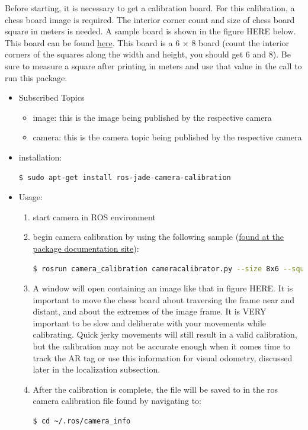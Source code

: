 \noindent Before starting, it is necessary to get a calibration board. For this calibration, a chess board image is required. The interior corner count and size of chess board square in meters is needed. A sample board is shown in the figure HERE below. This board can be found \href{http://wiki.ros.org/camera_calibration/Tutorials/
MonocularCalibration?action=AttachFile&do=view&target=check-108.pdf}{here}. This board is a 6 $\times$ 8 board (count the interior corners of the squares along the width and height, you should get 6 and 8). Be sure to measure a square after printing in meters and use that value in the call to run this package.\\ 
\begin{itemize}
\item Subscribed Topics
\begin{itemize}
\item image: this is the image being published by the respective camera 
\item camera: this is the camera topic being published by the respective camera
\end{itemize}
\item installation:
\begin{lstlisting}[language=bash]
$ sudo apt-get install ros-jade-camera-calibration
\end{lstlisting}
\item Usage:
\begin{enumerate}
\item start camera in ROS environment
\item begin camera calibration by using the following sample (\href{http://wiki.ros.org/camera_calibration}{found at the package documentation site}):
\begin{lstlisting}[language=bash]
$ rosrun camera_calibration cameracalibrator.py --size 8x6 --square 0.108 image:=/my_camera/image camera:=/my_camera
\end{lstlisting}
\item A window will open containing an image like that in figure HERE. It is important to move the chess board about traversing the frame near and distant, and about the extremes of the image frame. It is VERY important to be slow and deliberate with your movements while calibrating. Quick jerky movements will still result in a valid calibration, but the calibration may not be accurate enough when it comes time to track the AR tag or use this information for visual odometry, discussed later in the localization subsection.
\item After the calibration is complete, the file will be saved to in the ros camera calibration file found by navigating to:
\begin{lstlisting}[language=bash]
$ cd ~/.ros/camera_info
\end{lstlisting}


\end{enumerate}
\end{itemize}
